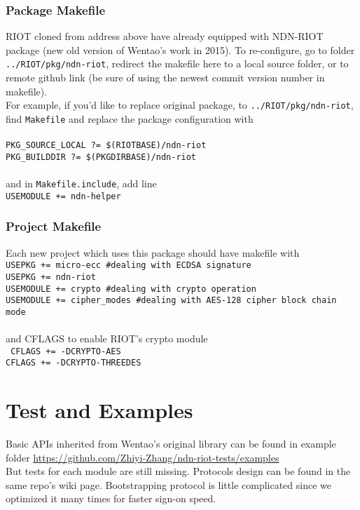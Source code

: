 \documentclass[a4paper, 11pt]{article}
\begin{document}
        \subsubsection*{Package Makefile}
        RIOT cloned from address above have already equipped with NDN-RIOT package (new old version of Wentao's work in 2015). To re-configure, go to folder \texttt{../RIOT/pkg/ndn-riot}, redirect the makefile here to a local source folder, or to remote github link (be sure of using the newest commit version number in makefile).\\
        For example, if you'd like to replace original package, to \texttt{../RIOT/pkg/ndn-riot}, find \texttt{Makefile} and replace the package configuration with \\ \\
        \texttt{PKG\_SOURCE\_LOCAL ?= \$(RIOTBASE)/ndn-riot \\
                PKG\_BUILDDIR ?= \$(PKGDIRBASE)/ndn-riot} \\ \\
        and in \texttt{Makefile.include}, add line \\
        \texttt{USEMODULE += ndn-helper}

        \subsubsection*{Project Makefile}
        Each new project which uses this package should have makefile with \\
        \texttt{USEPKG += micro-ecc \hfill \#dealing with ECDSA signature\\
                USEPKG += ndn-riot  \\
                USEMODULE += crypto \hfill \#dealing with crypto operation\\
                USEMODULE += cipher\_modes \hfill \#dealing with AES-128 cipher block chain mode}\\ \\
        and CFLAGS to enable RIOT's crypto module \\
        \texttt{
                CFLAGS += -DCRYPTO-AES \\
                CFLAGS += -DCRYPTO-THREEDES} \\
    
        \section*{Test and Examples}
        Basic APIs inherited from Wentao's original library can be found in example folder \url{https://github.com/Zhiyi-Zhang/ndn-riot-tests/examples}\\ But tests for each module are still missing. Protocols design can be found in the same repo's wiki page. Bootstrapping protocol is little complicated since we optimized it many times for faster sign-on speed. 
 
\end{document}
